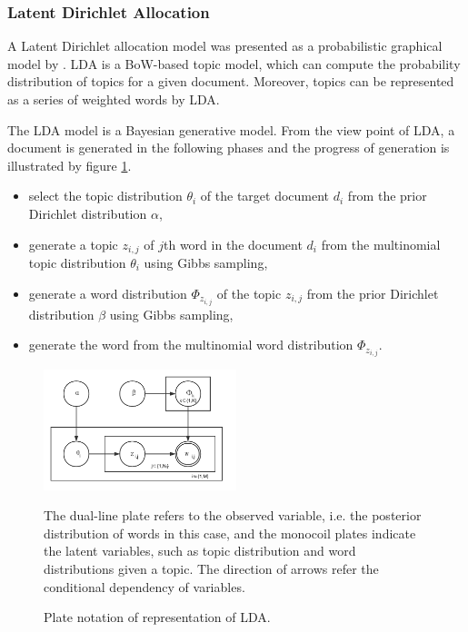 \subsubsection{Latent Dirichlet Allocation}

A Latent Dirichlet allocation model was presented as a probabilistic graphical model by \cite{Blei:2003}. LDA is a BoW-based topic model, which can compute the probability distribution of topics for a given document. Moreover, topics can be represented as a series of weighted words by LDA. 

The LDA model is a Bayesian generative model. From the view point of LDA, a document is generated in the following phases and the progress of generation is illustrated by figure \ref{fig:lda}.

\begin{itemize}
    \item[1.] select the topic distribution $\theta_i$ of the target document $d_i$ from the prior Dirichlet distribution $\alpha$, 
    \item[2.] generate a topic $z_{i,j}$ of $j$th word in the document $d_i$ from the multinomial topic distribution $\theta_i$ using Gibbs sampling,
    \item[3.] generate a word distribution $\Phi_{z_{i,j}}$ of the topic $z_{i,j}$ from the prior Dirichlet distribution $\beta$ using Gibbs sampling, 
    \item[4.] generate the word from the multinomial word distribution $\Phi_{z_{i,j}}$. 
\end{itemize}



\begin{figure}[!htb]
    \centering
    \includegraphics[width=0.5\textwidth]{fig/lda.pdf}
    \caption{Plate notation of representation of LDA.}
    The dual-line plate refers to the observed variable, i.e. the posterior distribution of words in this case, and the monocoil plates indicate the latent variables, such as topic distribution and word distributions given a topic. The direction of arrows refer the conditional dependency of variables. 
    \label{fig:lda}
\end{figure}

